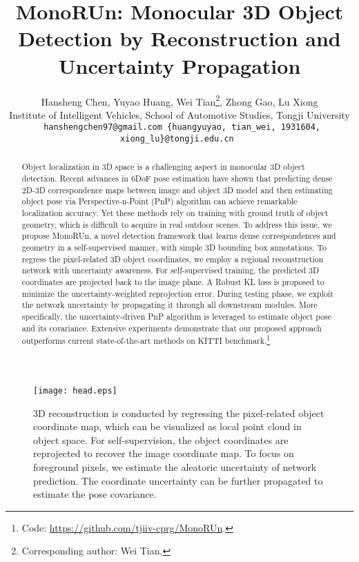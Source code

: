 \documentclass[10pt,twocolumn,letterpaper]{article}
\begin{document}
\title{
MonoRUn: Monocular 3D Object Detection by Reconstruction and \protect\\ Uncertainty Propagation
}

\author{
Hansheng Chen, 
Yuyao Huang,
Wei Tian\thanks{Corresponding author: Wei Tian.}, 
Zhong Gao,
Lu Xiong\\
Institute of Intelligent Vehicles, School of Automotive Studies, Tongji University\\
{\tt\small
hanshengchen97@gmail.com \{huangyuyao, tian\_wei, 1931604, xiong\_lu\}@tongji.edu.cn
}
}

\maketitle


\begin{abstract}
Object localization in 3D space is a challenging aspect in monocular 3D object detection. Recent advances in 6DoF pose estimation have shown that predicting dense 2D-3D correspondence maps between image and object 3D model and then estimating object pose via Perspective-n-Point (PnP) algorithm can achieve remarkable localization accuracy. Yet these methods rely on training with ground truth of object geometry, which is difficult to acquire in real outdoor scenes. To address this issue, we propose MonoRUn, a novel detection framework that learns dense correspondences and geometry in a self-supervised manner, with simple 3D bounding box annotations. To regress the pixel-related 3D object coordinates, we employ a regional reconstruction network with uncertainty awareness. For self-supervised training, the predicted 3D coordinates are projected back to the image plane. A Robust KL loss is proposed to minimize the uncertainty-weighted reprojection error. During testing phase, we exploit the network uncertainty by propagating it through all downstream modules. More specifically, the uncertainty-driven PnP algorithm is leveraged to estimate object pose and its covariance. Extensive experiments demonstrate that our proposed approach outperforms current state-of-the-art methods on KITTI benchmark.\footnote{Code: \url{https://github.com/tjiiv-cprg/MonoRUn}.}
\end{abstract}

\begin{figure}[t]
\begin{center}
   \texttt{[image: head.eps]}
\end{center}
   \vspace{-2mm}
   \caption{3D reconstruction is conducted by regressing the pixel-related object coordinate map, which can be visualized as local point cloud in object space. For self-supervision, the object coordinates are reprojected to recover the image coordinate map. To focus on foreground pixels, we estimate the aleatoric uncertainty of network prediction. The coordinate uncertainty can be further propagated to estimate the pose covariance.}
\label{fig:abstract}
\end{figure}
\end{document}
